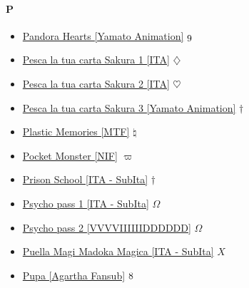 		\paragraph{P} \hypertarget{SP}{}
			\begin{itemize}
				
				\item \href{https://mega.nz/#F!STAhVI4Y!FMAh2ccuIdLpuh1HG0MAGg} {Pandora Hearts [Yamato Animation]}  $\oldstylenums{9}$ \\
				\item \href{https://mega.nz/#F!hoQhQTQL!aCDtuZrZGo4cXXHRFI3IwQ} {Pesca la tua carta Sakura 1 [ITA]}  $\diamondsuit$ \\ 
				\item \href{https://mega.nz/#F!y3pTwaAS!zFvKHE9YKDjxBkWzkMkYdA} {Pesca la tua carta Sakura 2 [ITA]}  $\heartsuit$ \\ 
				\item \href{https://mega.nz/#F!CPZxFYBC!nmI4GqZNf1gxdj8BrnYwdg} {Pesca la tua carta Sakura 3 [Yamato Animation]}  $\dag$ \\ 
				\item \href{https://mega.nz/#F!UjoTHKRB!kOxlrQWm5teyJEpMRejENw} {Plastic Memories [MTF]}  $\natural$ \\ 
				\item \href{https://mega.nz/#F!OdElhRRR!UHe2zjjnyuV-klPGrPNTew} {Pocket Monster [NIF]}  $\varpi$ \\
				\item \href{https://mega.nz/#F!fCQhBIwA!vSjeYmHYADANYZUrPI1YPg} {Prison School [ITA - SubIta]}  $\dag$ \\  
				\item \href{https://mega.nz/#F!prwh2boD!nFQEbLZiyP0GTblAgf2w0g} {Psycho pass 1 [ITA - SubIta]}  $\Omega$ \\ 
				\item \href{https://mega.nz/#F!s35HTQaB!7mD0Pi6cRynQ1Pep9dwr_A} {Psycho pass 2 [VVVVIIIIIIDDDDDD]}  $\Omega$ \\ 
				\item \href{https://mega.nz/#F!l7QDULyQ!Wlr-EaUBYr-kdexIark1kA} {Puella Magi Madoka Magica [ITA - SubIta]}  $X$ \\ 
				\item \href{https://mega.nz/#F!quJXwCCa!xNT7Yvx1XEnMKHAvH4jv8g} {Pupa [Agartha Fansub]}  $\oldstylenums{8}$ \\ 
			
			\end{itemize}
		
